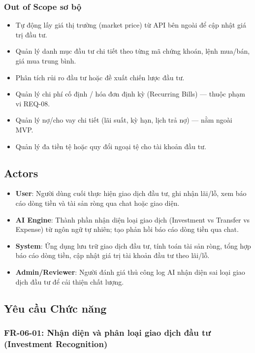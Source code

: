 \subsubsection{Out of Scope sơ bộ}

\begin{itemize}
\item Tự động lấy giá thị trường (market price) từ API bên ngoài để cập nhật giá trị đầu tư.
\item Quản lý danh mục đầu tư chi tiết theo từng mã chứng khoán, lệnh mua/bán, giá mua trung bình.
\item Phân tích rủi ro đầu tư hoặc đề xuất chiến lược đầu tư.
\item Quản lý chi phí cố định / hóa đơn định kỳ (Recurring Bills) — thuộc phạm vi REQ-08.
\item Quản lý nợ/cho vay chi tiết (lãi suất, kỳ hạn, lịch trả nợ) — nằm ngoài MVP.
\item Quản lý đa tiền tệ hoặc quy đổi ngoại tệ cho tài khoản đầu tư.
\end{itemize}
\subsection{Actors}

\begin{itemize}
\item \textbf{User}: Người dùng cuối thực hiện giao dịch đầu tư, ghi nhận lãi/lỗ, xem báo cáo dòng tiền và tài sản ròng qua chat hoặc giao diện.
\item \textbf{AI Engine}: Thành phần nhận diện loại giao dịch (Investment vs Transfer vs Expense) từ ngôn ngữ tự nhiên; tạo phản hồi báo cáo dòng tiền qua chat.
\item \textbf{System}: Ứng dụng lưu trữ giao dịch đầu tư, tính toán tài sản ròng, tổng hợp báo cáo dòng tiền, cập nhật giá trị tài khoản đầu tư theo lãi/lỗ.
\item \textbf{Admin/Reviewer}: Người đánh giá thủ công log AI nhận diện sai loại giao dịch đầu tư để cải thiện chất lượng.
\end{itemize}
\subsection{Yêu cầu Chức năng}



\subsubsection{FR-06-01: Nhận diện và phân loại giao dịch đầu tư (Investment Recognition)}


